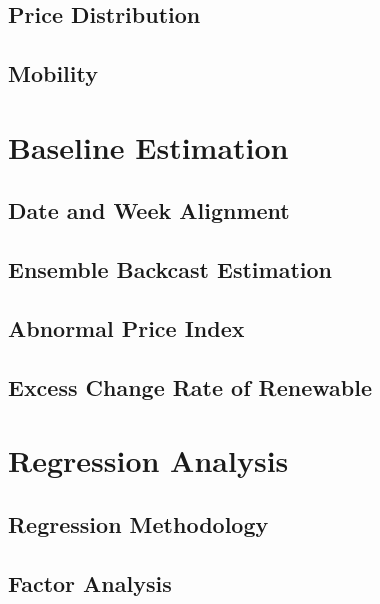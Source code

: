 \documentclass[11pt]{article}
\numberwithin{equation}{section}
\numberwithin{table}{section}
\numberwithin{figure}{section}
\begin{document}
\subsection{Price Distribution}

\subsection{Mobility}






\newpage
\section{Baseline Estimation} \label{sec:baseline}

\subsection{Date and Week Alignment}

\subsection{Ensemble Backcast Estimation}

\subsection{Abnormal Price Index}

\subsection{Excess Change Rate of Renewable}





\newpage
\section{Regression Analysis} \label{sec:regression}

\subsection{Regression Methodology}

\subsection{Factor Analysis}
\end{document}
